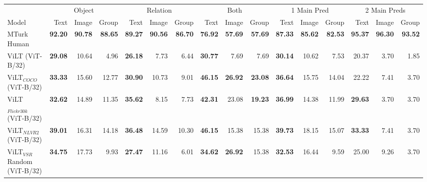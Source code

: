 \begin{table}[ht]
    \centering
    \begin{adjustbox}{max width=\textwidth}
  \begin{tabular}{l|rrr|rrr|rrr|rrr|rrr}
    \toprule
     &
      \multicolumn{3}{c|}{Object} &
      \multicolumn{3}{c|}{Relation} &
      \multicolumn{3}{c|}{Both} &
      \multicolumn{3}{c|}{1 Main Pred} &
      \multicolumn{3}{c}{2 Main Preds}\\
    Model & Text & Image & Group & Text & Image & Group & Text & Image & Group & Text & Image & Group & Text & Image & Group \\\midrule
 MTurk Human                  & \textbf{92.20} & \textbf{90.78} & \textbf{88.65} & \textbf{89.27} & \textbf{90.56} & \textbf{86.70} & \textbf{76.92} & \textbf{57.69} & \textbf{57.69} & \textbf{87.33} & \textbf{85.62} & \textbf{82.53} & \textbf{95.37} & \textbf{96.30} & \textbf{93.52} \\
ViLT (ViT-B/32)                     & \textbf{29.08} & 10.64          & 4.96           & \textbf{26.18} & 7.73           & 6.44           & \textbf{30.77} & 7.69           & 7.69           & \textbf{30.14} & 10.62          & 7.53           & 20.37          & 3.70           & 1.85           \\
 ViLT$_{COCO}$ (ViT-B/32)            & \textbf{33.33} & 15.60          & 12.77          & \textbf{30.90} & 10.73          & 9.01           & \textbf{46.15} & \textbf{26.92} & \textbf{23.08} & \textbf{36.64} & 15.75          & 14.04          & 22.22          & 7.41           & 3.70           \\
 ViLT$_{Flickr30k}$ (ViT-B/32)       & \textbf{32.62} & 14.89          & 11.35          & \textbf{35.62} & 8.15           & 7.73           & \textbf{42.31} & 23.08          & \textbf{19.23} & \textbf{36.99} & 14.38          & 11.99          & \textbf{29.63} & 3.70           & 3.70           \\
 ViLT$_{NLVR2}$ (ViT-B/32)           & \textbf{39.01} & 16.31          & 14.18          & \textbf{36.48} & 14.59          & 10.30          & \textbf{46.15} & 15.38          & 15.38          & \textbf{39.73} & 18.15          & 15.07          & \textbf{33.33} & 7.41           & 3.70           \\
 ViLT$_{VSR}$ Random (ViT-B/32)      & \textbf{34.75} & 17.73          & 9.93           & \textbf{27.47} & 11.16          & 6.01           & \textbf{34.62} & \textbf{26.92} & 15.38          & \textbf{32.53} & 16.44          & 9.59           & 25.00          & 9.26           & 3.70           \\

\end{tabular}
\end{adjustbox}
\end{table}
